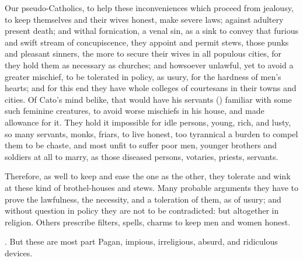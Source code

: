Our pseudo-Catholics, to help these inconveniences which proceed from
jealousy, to keep themselves and their wives honest, make severe laws;
against adultery present death; and withal fornication, a venal sin, as
a sink to convey that furious and swift stream of concupiscence, they
appoint and permit stews, those punks and pleasant sinners, the more to
secure their wives in all populous cities, for they hold them as
necessary as churches; and howsoever unlawful, yet to avoid a greater
mischief, to be tolerated in policy, as usury, for the hardness of
men's hearts; and for this end they have whole colleges of courtesans
in their towns and cities. Of Cato's mind belike, that would have
his servants () familiar
with some such feminine creatures, to avoid worse mischiefs in his
house, and made allowance for it. They hold it impossible for idle
persons, young, rich, and lusty, so many servants, monks, friars, to
live honest, too tyrannical a burden to compel them to be chaste, and
most unfit to suffer poor men, younger brothers and soldiers at all to
marry, as those diseased persons, votaries, priests, servants.

Therefore, as well to keep and ease the one as the other, they tolerate
and wink at these kind of brothel-houses and stews. Many probable
arguments they have to prove the lawfulness, the necessity, and a
toleration of them, as of usury; and without question in policy they
are not to be contradicted: but altogether in religion. Others
prescribe filters, spells, charms to keep men and women honest.

.  But these are most part Pagan, impious, irreligious,
absurd, and ridiculous devices.

